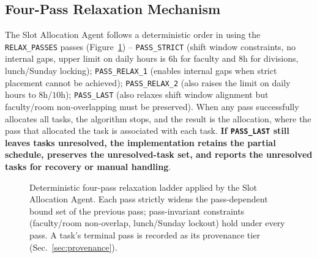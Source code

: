 \documentclass[conference]{IEEEtran}
\begin{document}
\subsection{Four-Pass Relaxation Mechanism}
\label{sec:relaxation}
The Slot Allocation Agent follows a deterministic order in using the \texttt{RELAX\_PASSES} passes (Figure~\ref{fig:relax}) -- \texttt{PASS\_STRICT} (shift window constraints, no internal gaps, upper limit on daily hours is $6$h for faculty and $8$h for divisions, lunch/Sunday locking); \texttt{PASS\_RELAX\_1} (enables internal gaps when strict placement cannot be achieved); \texttt{PASS\_RELAX\_2} (also raises the limit on daily hours to $8$h/$10$h); \texttt{PASS\_LAST} (also relaxes shift window alignment but faculty/room non-overlapping must be preserved). When any pass successfully allocates all tasks, the algorithm stops, and the result is the allocation, where the pass that allocated the task is associated with each task. \textbf{If \texttt{PASS\_LAST} still leaves tasks unresolved, the implementation retains the partial schedule, preserves the unresolved-task set, and reports the unresolved tasks for recovery or manual handling}.

\begin{figure}[t]
\vspace{-1mm}
\centering
{}
\vspace{-2mm}
\caption{Deterministic four-pass relaxation ladder applied by the Slot Allocation Agent. Each pass strictly widens the pass-dependent bound set of the previous pass; pass-invariant constraints (faculty/room non-overlap, lunch/Sunday lockout) hold under every pass. A task's terminal pass is recorded as its provenance tier (Sec.~\ref{sec:provenance}).}
\label{fig:relax}
\vspace{-2mm}
\end{figure}
\end{document}
